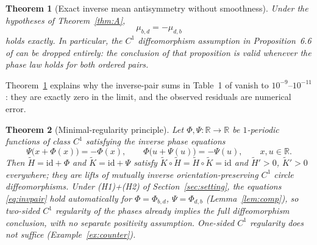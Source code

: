 \documentclass[11pt]{article}
\newtheorem{theoremA}{Theorem}
\theoremstyle{definition}
\theoremstyle{remark}
\newcommand{\R}{\mathbb{R}}
\newcommand{\Ht}{\widetilde H}
\newcommand{\Kt}{\widetilde K}
\begin{document}
\begin{theoremA}[Exact inverse mean antisymmetry without smoothness]\label{thm:B}
Under the hypotheses of Theorem~\textup{\ref{thm:A}},
\[
\mu_{b,d}=-\mu_{d,b}
\]
holds exactly. In particular, the $C^{1}$ diffeomorphism assumption in
Proposition~6.6 of \cite{J} can be dropped entirely: the conclusion of
that proposition is valid whenever the phase law holds for both ordered
pairs.
\end{theoremA}

Theorem~\ref{thm:B} explains why the inverse-pair sums in Table~1 of
\cite{J} vanish to $10^{-9}$--$10^{-11}$: they are exactly zero in the
limit, and the observed residuals are numerical error.

\begin{theoremA}[Minimal-regularity principle]\label{thm:C}
Let $\Phi,\Psi:\R\to\R$ be $1$-periodic functions of class $C^{1}$
satisfying the inverse phase equations
\begin{equation}\label{eq:invpair}
\Psi\big(x+\Phi(x)\big)=-\Phi(x),
\qquad
\Phi\big(u+\Psi(u)\big)=-\Psi(u),
\qquad x,u\in\R .
\end{equation}
Then $\Ht=\mathrm{id}+\Phi$ and $\Kt=\mathrm{id}+\Psi$ satisfy
$\Kt\circ\Ht=\Ht\circ\Kt=\mathrm{id}$ and $\Ht'>0$, $\Kt'>0$ everywhere;
they are lifts of mutually inverse orientation-preserving $C^{1}$ circle
diffeomorphisms. Under \textup{(H1)}+\textup{(H2)} of
Section~\ref{sec:setting}, the equations \eqref{eq:invpair} hold
automatically for $\Phi=\Phi_{b,d}$, $\Psi=\Phi_{d,b}$
(Lemma~\ref{lem:comp}), so two-sided $C^{1}$ regularity of the phases
already implies the full diffeomorphism conclusion, with no separate
positivity assumption. One-sided $C^{1}$ regularity does not suffice
(Example~\ref{ex:counter}).
\end{theoremA}
\end{document}
